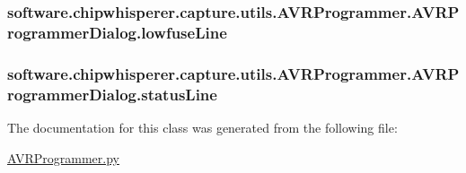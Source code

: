 \subsubsection[{lowfuse\+Line}]{\setlength{\rightskip}{0pt plus 5cm}software.\+chipwhisperer.\+capture.\+utils.\+A\+V\+R\+Programmer.\+A\+V\+R\+Programmer\+Dialog.\+lowfuse\+Line}\label{classsoftware_1_1chipwhisperer_1_1capture_1_1utils_1_1AVRProgrammer_1_1AVRProgrammerDialog_a83ff125ead745344951f8b53b6cc961e}
\hypertarget{classsoftware_1_1chipwhisperer_1_1capture_1_1utils_1_1AVRProgrammer_1_1AVRProgrammerDialog_af448eaf0fd053a978a868177b0956fe6}{}
\subsubsection[{status\+Line}]{\setlength{\rightskip}{0pt plus 5cm}software.\+chipwhisperer.\+capture.\+utils.\+A\+V\+R\+Programmer.\+A\+V\+R\+Programmer\+Dialog.\+status\+Line}\label{classsoftware_1_1chipwhisperer_1_1capture_1_1utils_1_1AVRProgrammer_1_1AVRProgrammerDialog_af448eaf0fd053a978a868177b0956fe6}


The documentation for this class was generated from the following file\+:\begin{DoxyCompactItemize}
\item 
\hyperlink{AVRProgrammer_8py}{A\+V\+R\+Programmer.\+py}\end{DoxyCompactItemize}

